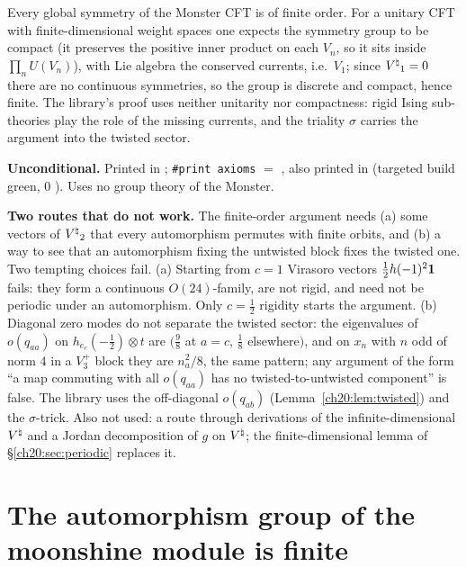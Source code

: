 \begin{physics}
Every global symmetry of the Monster CFT is of finite order.  For a unitary CFT with finite-dimensional weight spaces one
expects the symmetry group to be compact (it preserves the positive inner product on each $V_n$, so it sits inside
$\prod_nU(V_n)$), with Lie algebra the conserved currents, i.e.\ $V_1$; since ${V^{\natural}}_1=0$ there are no continuous symmetries,
so the group is discrete and compact, hence finite.  The library's proof uses neither unitarity nor compactness: rigid
Ising sub-theories play the role of the missing currents, and the triality $\sigma$ carries the argument into the twisted
sector.
\end{physics}
\begin{status}
\textbf{Unconditional.}  Printed in ; \texttt{\#print axioms} $=$
, also printed in 
(targeted build green, 0 ).  Uses no group theory of the Monster.
\end{status}

\begin{warning}
\textbf{Two routes that do not work.}  The finite-order argument needs (a) some
vectors of ${V^{\natural}}_2$ that every automorphism permutes with finite orbits, and (b) a way to see that an automorphism fixing the
untwisted block fixes the twisted one.  Two tempting choices fail.  (a) Starting from $c=1$ Virasoro vectors
$\tfrac12h(-1)^2\mathbf 1$ fails: they form a continuous $O(24)$-family, are not rigid, and need not be periodic under
an automorphism.  Only $c=\tfrac12$ rigidity starts the argument.  (b) Diagonal zero modes do not separate the twisted sector:
the eigenvalues of $o(q_{aa})$ on $h_{e_c}(-\tfrac12)\otimes t$ are $(\tfrac98$ at $a=c$, $\tfrac18$ elsewhere$)$, and on $x_n$
with $n$ odd of norm $4$ in a $V_3^+$ block they are $n_a^2/8$, the same pattern; any argument of the form ``a map commuting
with all $o(q_{aa})$ has no twisted-to-untwisted component'' is false.  The library uses the off-diagonal $o(q_{ab})$
(Lemma~\ref{ch20:lem:twisted}) and the $\sigma$-trick.  Also not used: a route through derivations of the
infinite-dimensional ${V^{\natural}}$ and a Jordan decomposition of $g$ on ${V^{\natural}}$; the finite-dimensional lemma of
\S\ref{ch20:sec:periodic} replaces it.
\end{warning}

\section{The automorphism group of the moonshine module is finite}\label{ch20:sec:finite}

